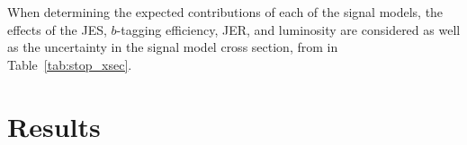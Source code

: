 \begin{table}[ht]
\caption{Summary of the effect of each considered sources of systematic
  uncertainty on the total background estimate in SR~400 and SR~600.
  If the uncertainty is asymmetric, the larger deviation is reported in this
  table.
  {\color{red} TODO update this table with broken down info and CRs.}
}
\label{tab:systematic_breakdown}
%
\end{table}

When determining the expected contributions of each of the signal models,
the effects of the JES, $b$-tagging efficiency, JER, and luminosity are
considered as well as the uncertainty in the signal model cross section,
from in Table~\ref{tab:stop_xsec}.

\chapter[Results][Results]{Results}
\label{ch:results}

